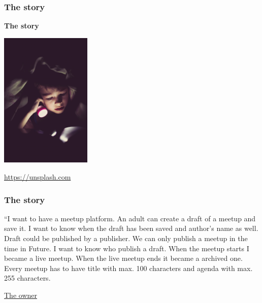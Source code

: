 \documentclass{beamer}
\newcommand{\source}[2]{
	\begin{flushright}
		\hfill {\scriptsize \href{#1}{#2}}	
	\end{flushright}
}
\begin{document}
\begin{frame}
\frametitle{\textbf{The story}}

\begin{minipage}{0.45\textwidth}
\begin{center}
    {\fontsize{50}{60}\selectfont \textbf{The story}}
\end{center}
\end{minipage}
\begin{minipage}{0.45\textwidth}
    \hspace{15mm}
    \includegraphics[height=65mm]{story.jpg}
    \source{https://unsplash.com/photos/UYNH5VCsYPU}{https://unsplash.com}
\end{minipage}

\end{frame}

\begin{frame}
\frametitle{\textbf{The story}}

\begin{displayquote}
    ``I want to have a meetup platform. An adult can create a draft of a meetup and save it. 
    I want to know when the draft has been saved and author's name as well.
    Draft could be published by a publisher. We can only publish a meetup in the time in Future.
    I want to know who publish a draft. When the meetup starts I became a live meetup. 
    When the live meetup ends it became a archived one. \\
    Every meetup has to have title with max. 100 characters and agenda with max. 255 characters.
    \vskip 2mm
    \source{}{The owner}
\end{displayquote}

\end{frame}
\end{document}
